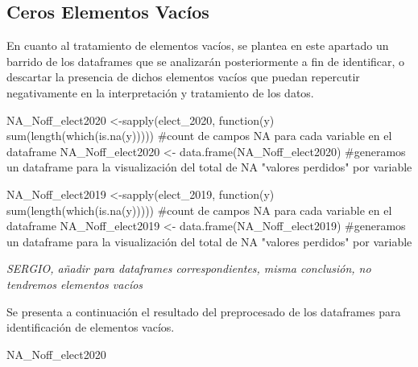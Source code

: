 \documentclass[
]{article}
\newenvironment{Shaded}{\begin{snugshade}}{\end{snugshade}}
\newcommand{\CommentTok}[1]{\textcolor[rgb]{0.50,0.62,0.50}{#1}}
\newcommand{\ControlFlowTok}[1]{\textcolor[rgb]{0.94,0.87,0.69}{#1}}
\newcommand{\DecValTok}[1]{\textcolor[rgb]{0.86,0.86,0.80}{#1}}
\newcommand{\KeywordTok}[1]{\textcolor[rgb]{0.94,0.87,0.69}{#1}}
\newcommand{\NormalTok}[1]{\textcolor[rgb]{0.80,0.80,0.80}{#1}}
\newcommand{\StringTok}[1]{\textcolor[rgb]{0.80,0.58,0.58}{#1}}
\begin{document}
\hypertarget{ceros-elementos-vacuxedos}{%
\subsection{Ceros Elementos Vacíos}\label{ceros-elementos-vacuxedos}}

En cuanto al tratamiento de elementos vacíos, se plantea en este
apartado un barrido de los dataframes que se analizarán posteriormente a
fin de identificar, o descartar la presencia de dichos elementos vacíos
que puedan repercutir negativamente en la interpretación y tratamiento
de los datos.

\begin{Shaded}
\begin{Highlighting}[]
\NormalTok{NA_Noff_elect2020 <-}\KeywordTok{sapply}\NormalTok{(elect_}\DecValTok{2020}\NormalTok{, }\ControlFlowTok{function}\NormalTok{(y) }\KeywordTok{sum}\NormalTok{(}\KeywordTok{length}\NormalTok{(}\KeywordTok{which}\NormalTok{(}\KeywordTok{is.na}\NormalTok{(y))))) }\CommentTok{#count de campos NA para cada variable en el dataframe}
\NormalTok{NA_Noff_elect2020 <-}\StringTok{ }\KeywordTok{data.frame}\NormalTok{(NA_Noff_elect2020) }\CommentTok{#generamos un dataframe para la visualización del total de NA "valores perdidos" por variable}

\NormalTok{NA_Noff_elect2019 <-}\KeywordTok{sapply}\NormalTok{(elect_}\DecValTok{2019}\NormalTok{, }\ControlFlowTok{function}\NormalTok{(y) }\KeywordTok{sum}\NormalTok{(}\KeywordTok{length}\NormalTok{(}\KeywordTok{which}\NormalTok{(}\KeywordTok{is.na}\NormalTok{(y))))) }\CommentTok{#count de campos NA para cada variable en el dataframe}
\NormalTok{NA_Noff_elect2019 <-}\StringTok{ }\KeywordTok{data.frame}\NormalTok{(NA_Noff_elect2019) }\CommentTok{#generamos un dataframe para la visualización del total de NA "valores perdidos" por variable}
\end{Highlighting}
\end{Shaded}

{ \emph{SERGIO, añadir para dataframes correspondientes, misma
conclusión, no tendremos elementos vacíos}}

Se presenta a continuación el resultado del preprocesado de los
dataframes para identificación de elementos vacíos.

\begin{Shaded}
\begin{Highlighting}[]
\NormalTok{NA_Noff_elect2020}
\end{Highlighting}
\end{Shaded}
\end{document}
